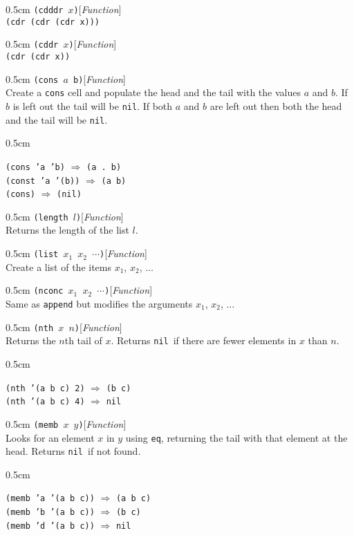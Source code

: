 \documentclass[a4paper]{article}
\newcommand{\lisp}[1]{\texttt{#1}}
\newcommand{\NIL}{\lisp{nil}}
\newcommand{\xargs}{$x_{1}$ $x_{2}$ $\cdots$}
\newcommand{\largs}{$x_{1}$, $x_{2}$, $\ldots$}
\newenvironment{examples}{
  \newcommand{\ex}[2]{
    \lisp{##1} $\Rightarrow$ \lisp{##2}\\
  }
  \begin{adjustwidth}{0.5cm}{}}{\end{adjustwidth}}
\newenvironment{defun}[2]{\begin{adjustwidth}{0.5cm}{}
    {\hspace*{-0.5cm}\lisp{#2}\hfill[\textit{#1}]\\}}
               {\end{adjustwidth}}
\begin{document}
\begin{defun}{Function}{(cdddr $x$)}
  \lisp{(cdr (cdr (cdr x)))}
\end{defun}

\begin{defun}{Function}{(cddr $x$)}
  \lisp{(cdr (cdr x))}
\end{defun}

\begin{defun}{Function}{(cons $a$ b)}
  Create a \lisp{cons} cell and populate the head and the tail with
  the values $a$ and $b$. If $b$ is left out the tail will be \NIL. If
  both $a$ and $b$ are left out then both the head and the tail will
  be \NIL.

  \begin{examples}
    \ex{(cons 'a 'b)}{(a .\ b)}
    \ex{(const 'a '(b))}{(a b)}
    \ex{(cons)}{(nil)}
  \end{examples}
\end{defun}

\begin{defun}{Function}{(length $l$)}
  Returns the length of the list $l$.
\end{defun}

\begin{defun}{Function}{(list \xargs)}
  Create a list of the items \largs
\end{defun}

\begin{defun}{Function}{(nconc \xargs)}
  Same as \lisp{append} but modifies the arguments \largs
\end{defun}

\begin{defun}{Function}{(nth $x$ $n$)}
  Returns the $n$th tail of $x$. Returns \NIL\ if there are fewer
  elements in $x$ than $n$.

  \begin{examples}
    \ex{(nth '(a b c) 2)}{(b c)}
    \ex{(nth '(a b c) 4)}{nil}
  \end{examples}
\end{defun}

\begin{defun}{Function}{(memb $x$ $y$)}
  Looks for an element $x$ in $y$ using \lisp{eq}, returning the tail
  with that element at the head. Returns \NIL\ if not found.

  \begin{examples}
    \ex{(memb 'a '(a b c))}{(a b c)}
    \ex{(memb 'b '(a b c))}{(b c)}
    \ex{(memb 'd '(a b c))}{nil}
  \end{examples}

\end{defun}
\end{document}
